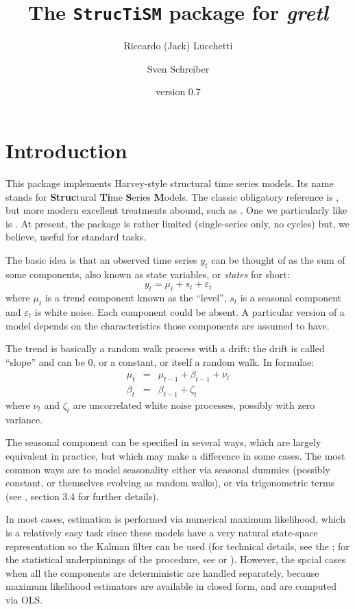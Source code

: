 \documentclass[a4paper,10pt]{article}
\title{The \texttt{StrucTiSM} package for \emph{gretl}}
\author{Riccardo (Jack) Lucchetti \and Sven Schreiber}
\date{version 0.7}
\begin{document}
\maketitle
\section{Introduction}

This package implements Harvey-style structural time series
models. Its name stands for \textbf{Struc}tural \textbf{Ti}me
\textbf{S}eries \textbf{M}odels. The classic obligatory reference is
\cite{Harvey1989}, but more modern excellent treatments abound, such
as \cite{CK2007}. One we particularly like is \cite{Pelagatti2015}.
At present, the package is rather limited (single-series only, no
cycles) but, we believe, useful for standard tasks.

The basic idea is that an observed time series $y_t$ can be thought of
as the sum of some components, also known as state variables, or
\emph{states} for short: 
\begin{equation}
  \label{eq:measuremment}
  y_t = \mu_t + s_t + \varepsilon_t
\end{equation}
where $\mu_t$ is a trend component known as the ``level'', $s_t$ is a
seasonal component and $\varepsilon_t$ is white noise. Each component
could be absent.  A particular version of a model depends on the
characteristics those components are assumed to have.

The trend is basically a random walk process with a drift: the drift
is called ``slope'' and can be 0, or a constant, or itself a random
walk. In formulae:
\begin{eqnarray}
  \label{eq:level}
  \mu_t & = & \mu_{t-1} + \beta_{t-1} + \nu_t \\ 
  \label{eq:slope}
  \beta_t & = &  \beta_{t-1} + \zeta_t 
\end{eqnarray}
where $\nu_t$ and $\zeta_t$ are uncorrelated white noise processes,
possibly with zero variance.

The seasonal component can be specified in several ways, which are
largely equivalent in practice, but which may make a difference in
some cases. The most common ways are to model seasonality either via
seasonal dummies (possibly constant, or themselves evolving as random
walks), or via trigonometric terms (see \cite{Pelagatti2015}, section
3.4 for further details).

In most cases, estimation is performed via numerical maximum
likelihood, which is a relatively easy task since these models have a
very natural state-space representation so the Kalman filter can be
used (for technical details, see the \GUG; for the statistical
underpinnings of the procedure, see \cite{hamilton94} or
\cite{pollock99}). However, the spcial cases when all the components
are deterministic are handled separately, because maximum likelihood
estimators are available in closed form, and are computed via
OLS.
\end{document}
